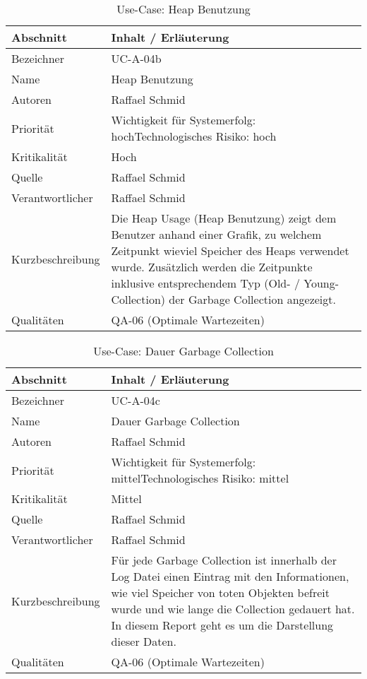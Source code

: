 \begin{longtable}{|p{4cm}|p{10.5cm}|}
\caption{Use-Case: Heap Benutzung}\\\hline
   \textbf{Abschnitt} & \textbf{Inhalt / Erläuterung} \\\hline
   Bezeichner & UC-A-04b\\\hline
   Name & Heap Benutzung\\\hline
   Autoren & Raffael Schmid\\\hline
   Priorität & Wichtigkeit für Systemerfolg: hoch\newline Technologisches Risiko: hoch\\\hline
   Kritikalität & Hoch\\\hline
   Quelle & Raffael Schmid\\\hline
   Verantwortlicher & Raffael Schmid\\\hline
   Kurzbeschreibung & Die Heap Usage (Heap Benutzung) zeigt dem Benutzer anhand einer Grafik, zu welchem Zeitpunkt wieviel Speicher des Heaps verwendet wurde. Zusätzlich werden die Zeitpunkte inklusive entsprechendem Typ (Old- / Young-Collection) der Garbage Collection angezeigt.  \\\hline
   Qualitäten & QA-06 (Optimale Wartezeiten)\\\hline
\end{longtable}

\begin{longtable}{|p{4cm}|p{10.5cm}|}
\caption{Use-Case: Dauer Garbage Collection}\\\hline
   \textbf{Abschnitt} & \textbf{Inhalt / Erläuterung} \\\hline
   Bezeichner & UC-A-04c\\\hline
   Name & Dauer Garbage Collection\\\hline
   Autoren & Raffael Schmid\\\hline
   Priorität & Wichtigkeit für Systemerfolg: mittel\newline Technologisches Risiko: mittel\\\hline
   Kritikalität & Mittel\\\hline
   Quelle & Raffael Schmid\\\hline
   Verantwortlicher & Raffael Schmid\\\hline
   Kurzbeschreibung & Für jede Garbage Collection ist innerhalb der Log Datei einen Eintrag mit den Informationen, wie viel Speicher von toten Objekten befreit wurde und wie lange die Collection gedauert hat. In diesem Report geht es um die Darstellung dieser Daten.\\\hline
   Qualitäten & QA-06 (Optimale Wartezeiten)\\\hline
\end{longtable}


